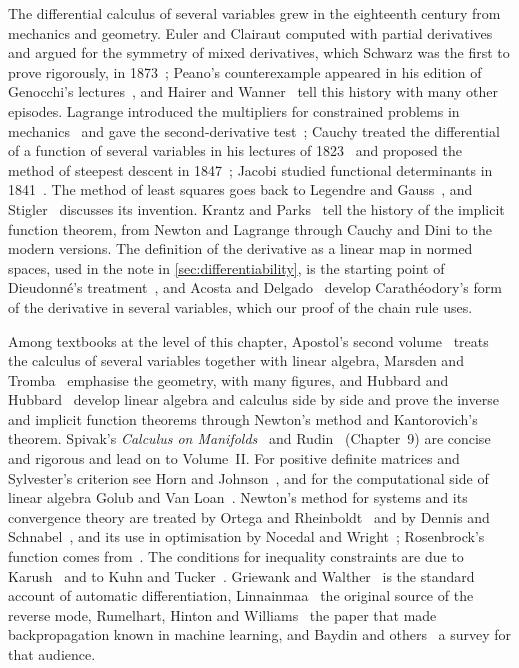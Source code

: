 The differential calculus of several variables grew in the eighteenth century from mechanics and geometry. Euler and Clairaut computed with partial derivatives and argued for the symmetry of mixed derivatives, which Schwarz was the first to prove rigorously, in 1873~\cite{schwarz1873}; Peano's counterexample appeared in his edition of Genocchi's lectures~\cite{genocchi1884}, and Hairer and Wanner~\cite{hairer1996analysis} tell this history with many other episodes. Lagrange introduced the multipliers for constrained problems in mechanics~\cite{lagrange1788} and gave the second-derivative test~\cite{lagrange1797}; Cauchy treated the differential of a function of several variables in his lectures of 1823~\cite{cauchy1823} and proposed the method of steepest descent in 1847~\cite{cauchy1847}; Jacobi studied functional determinants in 1841~\cite{jacobi1841}. The method of least squares goes back to Legendre and Gauss~\cite{legendre1805,gauss1809}, and Stigler~\cite{stigler1981} discusses its invention. Krantz and Parks~\cite{krantz2002ift} tell the history of the implicit function theorem, from Newton and Lagrange through Cauchy and Dini to the modern versions. The definition of the derivative as a linear map in normed spaces, used in the note in \cref{sec:differentiability}, is the starting point of Dieudonn\'e's treatment~\cite{dieudonne1960}, and Acosta and Delgado~\cite{acosta1994} develop Carath\'eodory's form of the derivative in several variables, which our proof of the chain rule uses.

Among textbooks at the level of this chapter, Apostol's second volume~\cite{apostol1969calculus} treats the calculus of several variables together with linear algebra, Marsden and Tromba~\cite{marsden2012vector} emphasise the geometry, with many figures, and Hubbard and Hubbard~\cite{hubbard2015vector} develop linear algebra and calculus side by side and prove the inverse and implicit function theorems through Newton's method and Kantorovich's theorem. Spivak's \emph{Calculus on Manifolds}~\cite{spivak1965manifolds} and Rudin~\cite{rudin1976} (Chapter~9) are concise and rigorous and lead on to Volume~II. For positive definite matrices and Sylvester's criterion see Horn and Johnson~\cite{horn2013}, and for the computational side of linear algebra Golub and Van Loan~\cite{golub2013}. Newton's method for systems and its convergence theory are treated by Ortega and Rheinboldt~\cite{ortega2000} and by Dennis and Schnabel~\cite{dennis1996}, and its use in optimisation by Nocedal and Wright~\cite{nocedal2006}; Rosenbrock's function comes from~\cite{rosenbrock1960}. The conditions for inequality constraints are due to Karush~\cite{karush1939} and to Kuhn and Tucker~\cite{kuhn1951}. Griewank and Walther~\cite{griewank2008} is the standard account of automatic differentiation, Linnainmaa~\cite{linnainmaa1976} the original source of the reverse mode, Rumelhart, Hinton and Williams~\cite{rumelhart1986} the paper that made backpropagation known in machine learning, and Baydin and others~\cite{baydin2018} a survey for that audience.

\chapterreferences
